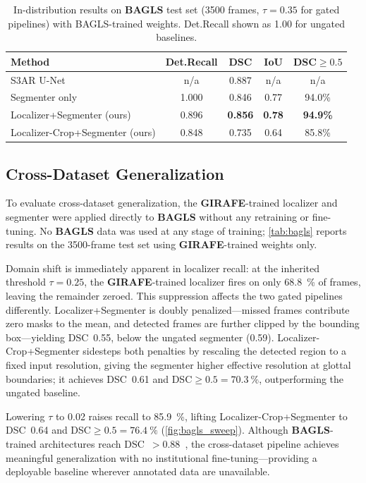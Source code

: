 \documentclass[preprint,12pt]{elsarticle}
\newcommand{\girafe}{\textbf{GIRAFE}}
\newcommand{\bagls}{\textbf{BAGLS}}
\newcommand{\yolounet}{Localizer+Segmenter}
\newcommand{\yolocrop}{Localizer-Crop+Segmenter}
\begin{document}
\begin{table}[t]
\centering
\caption{In-distribution results on \bagls{} test set (\num{3500} frames,
  $\tau{=}0.35$ for gated pipelines) with BAGLS-trained weights.
  Det.Recall shown as 1.00 for ungated baselines.}
\label{tab:bagls_indist}
\small
\setlength{\tabcolsep}{4pt}
\begin{tabular}{lcccc}
\toprule
Method & Det.Recall & DSC & IoU & DSC${\geq}0.5$ \\
\midrule
S3AR U-Net~\cite{montalbo2024}  & n/a   & 0.887 & n/a  & n/a \\
\midrule
Segmenter only                  & 1.000 & 0.846 & 0.77 & 94.0\% \\
\yolounet{} (ours)              & 0.896 & \textbf{0.856} & \textbf{0.78} & \textbf{94.9\%} \\
\yolocrop{} (ours)              & 0.848 & 0.735 & 0.64 & 85.8\% \\
\bottomrule
\end{tabular}
\end{table}

\subsection{Cross-Dataset Generalization}
\label{sec:results_bagls}

To evaluate cross-dataset generalization, the \girafe{}-trained localizer
and segmenter were applied directly to \bagls{} without any retraining
or fine-tuning.
No \bagls{} data was used at any stage of training; \cref{tab:bagls} reports
results on the \num{3500}-frame test set using \girafe{}-trained weights only.

Domain shift is immediately apparent in localizer recall: at the inherited
threshold $\tau{=}0.25$, the \girafe{}-trained localizer fires on only
\SI{68.8}{\%} of frames, leaving the remainder zeroed.
This suppression affects the two gated pipelines differently.
\yolounet{} is doubly penalized---missed frames contribute zero masks to the
mean, and detected frames are further clipped by the bounding box---yielding
DSC~\num{0.55}, below the ungated segmenter (\num{0.59}).
\yolocrop{} sidesteps both penalties by rescaling the detected region to a
fixed input resolution, giving the segmenter higher effective resolution at
glottal boundaries; it achieves DSC~\num{0.61} and DSC${\geq}0.5 = \SI{70.3}{\%}$,
outperforming the ungated baseline.

Lowering $\tau$ to \num{0.02} raises recall to \SI{85.9}{\%}, lifting
\yolocrop{} to DSC~\num{0.64} and DSC${\geq}0.5 = \SI{76.4}{\%}$
(\cref{fig:bagls_sweep}).
Although \bagls{}-trained architectures reach DSC~$>$\num{0.88}~\cite{montalbo2024},
the cross-dataset pipeline achieves meaningful generalization with no
institutional fine-tuning---providing a deployable baseline wherever
annotated data are unavailable.
\end{document}
